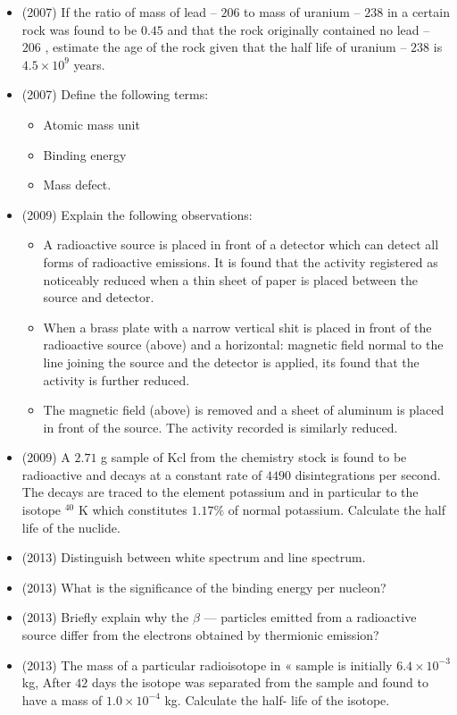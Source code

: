 \documentclass{article}
\begin{document}
\begin{itemize}
\item (2007)  If the ratio of mass of lead – $ 206$  to mass of uranium – $ 238$ in a certain rock was found to be $ 0.45$ and that the rock originally contained no lead – $ 206$ , estimate the age of the rock given that the half life of uranium – $ 238$ is $ 4.5 \times 10^{9}$ years.
\item (2007)  Define the following terms:
 \begin{itemize}
\item Atomic mass unit
\item Binding energy
\item Mass defect.
\end{itemize}
\item (2009)  Explain the following observations:
 \begin{itemize}
\item A radioactive source is placed in front of a detector which can detect all forms of radioactive emissions. It is found that the activity registered as noticeably reduced when a thin sheet of paper is placed between the source and detector.
\item When a brass plate with a narrow vertical shit is placed in front of the radioactive source (above) and a horizontal: magnetic field normal to the line joining the source and the detector is applied, its found that the activity is further reduced.
\item The magnetic field (above) is removed and a sheet of aluminum is placed in front of the source. The activity recorded is similarly reduced.
\end{itemize}
\item (2009)  A $ 2.71$ g sample of Kcl from the chemistry stock is found to be radioactive and decays at a constant rate of $ 4490$ disintegrations per second.  The decays are traced to the element potassium and in particular to the isotope $ ^{40}$ K which constitutes $ 1.17\%$ of normal potassium.  Calculate the half life of the nuclide.
\item (2013)  Distinguish between white spectrum and line spectrum. 
\item (2013)  What is the significance of the binding energy per nucleon? 
\item (2013)  Briefly explain why the $ \beta$  — particles emitted from a radioactive source differ from the electrons obtained by thermionic emission? 
\item (2013)  The mass of a particular radioisotope in « sample is initially $ 6.4 \times 10^{-3}$ kg, After $ 42$ days the isotope was separated from the sample and found to have a mass of $ 1.0 \times 10^{-4}$ kg. Calculate the half- life of the isotope.

\end{itemize}
\end{document}
